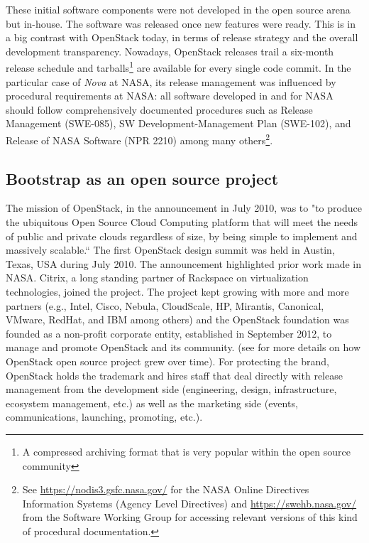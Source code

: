 These initial software components were not developed in the open source arena but in-house. The software was released once new features were ready. This is in a big contrast with OpenStack today, in terms of release strategy and the overall development transparency.  Nowadays, OpenStack releases trail a six-month release schedule and tarballs\footnote{A compressed archiving format that is very popular within the open source community} are available for every single code commit. In the particular case of \textit{Nova} at NASA, its release management was influenced by procedural requirements at NASA: all software developed in and for NASA should follow comprehensively documented procedures such as  Release Management (SWE-085), SW Development-Management Plan (SWE-102),  and Release of NASA Software (NPR 2210) among many others\footnote{See \url{https://nodis3.gsfc.nasa.gov/} for the NASA Online Directives Information Systems (Agency Level Directives) and \url{https://swehb.nasa.gov/} from the Software Working Group for accessing relevant versions of this kind of procedural documentation.}.


\subsection{Bootstrap as an open source project}

The mission of OpenStack, in the announcement in July 2010, was to "to produce the ubiquitous Open Source Cloud Computing platform that will meet the needs of public and private clouds regardless of size, by being simple to implement and massively scalable.`` The first OpenStack design summit was held in Austin, Texas, USA during July 2010. The announcement highlighted prior work made in NASA. Citrix, a long standing partner of Rackspace on virtualization technologies,  joined the project.  The project kept growing with more and more partners (e.g., Intel, Cisco, Nebula, CloudScale, HP, Mirantis, Canonical, VMware, RedHat, and IBM among others) and the OpenStack foundation was founded as a non-profit corporate entity, established in September 2012, to manage and promote OpenStack and its community. 
(see \cite{teixeira2015lessons,teixeira_and_Hyrynsalmi2017icsob} for more details on how OpenStack open source project grew over time). For protecting the brand, OpenStack holds the trademark and hires staff that deal directly with release management from the development side (engineering, design, infrastructure, ecosystem management, etc.) as well as the marketing side (events, communications, launching, promoting, etc.). 

